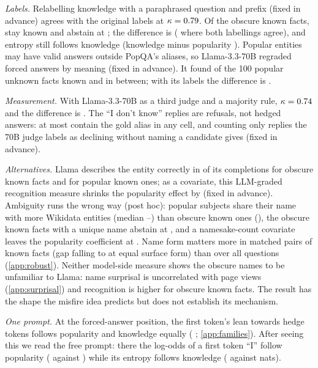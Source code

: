 \documentclass{article}
\newcommand{\idk}{``I don't know''}
\begin{document}
\emph{Labels.} Relabelling knowledge with a paraphrased question and prefix (fixed in advance) agrees with the original labels at $\kappa=0.79$. Of the \gsObsKnownTotal{} obscure known facts, \eoObsKnownN{} stay known and abstain at \eoObsKnown; the difference is \eoDiff{} \eoDiffCI{} (\lcCons{} \lcConsCI{} where both labellings agree), and entropy still follows knowledge (knowledge minus popularity \eoEntKmP{} \eoEntKmPCI). Popular entities may have valid answers outside PopQA's aliases, so Llama-3.3-70B regraded forced answers by meaning (fixed in advance). It found \sePUKnown{} of the 100 popular unknown facts known and \sePUInter{} in between; with its labels the difference is \seDiff{} \seDiffCI.

\emph{Measurement.} With Llama-3.3-70B as a third judge and a majority rule, $\kappa=0.74$ and the difference is \tjLlamaDiff{} \tjLlamaDiffCI. The \idk{} replies are refusals, not hedged answers: at most \lcDKAliasMax{} contain the gold alias in any cell, and counting only replies the 70B judge labels as declining without naming a candidate gives \sdDiff{} \sdDiffCI{} (fixed in advance).

\emph{Alternatives.} Llama describes the entity correctly in \ekObsKnown{} of its completions for obscure known facts and \ekPopKnown{} for popular known ones; as a covariate, this LLM-graded recognition measure shrinks the popularity effect by \ekShrink{} (fixed in advance). Ambiguity runs the wrong way (post hoc): popular subjects share their name with more Wikidata entities (median \amPopKnownHom--\amPopUnkHom) than obscure known ones (\amObsKnownHom), the \amSingleN{} obscure known facts with a unique name abstain at \amSingle, and a namesake-count covariate leaves the popularity coefficient at \amObs{} \amObsCI. Name form matters more in matched pairs of known facts (gap \scPopKnownGap{} falling to \scPopKnownGapSurface{} \scPopKnownGapSurfaceCI{} at equal surface form) than over all questions (\cref{app:robust}). Neither model-side measure shows the obscure names to be unfamiliar to Llama: name surprisal is uncorrelated with page views (\cref{app:surprisal}) and recognition is higher for obscure known facts. The result has the shape the misfire idea predicts but does not establish its mechanism.

\emph{One prompt.} At the forced-answer position, the first token's lean towards hedge tokens follows popularity and knowledge equally (\loLlamaDiff{} \loLlamaDiffCI; \cref{app:families}). After seeing this we read the free prompt: there the log-odds of a first token ``I'' follow popularity (\eoFreeIPop{} against \eoFreeIKnow) while its entropy follows knowledge (\eoFreeEntKnow{} against \eoFreeEntPop{} nats).
\end{document}
